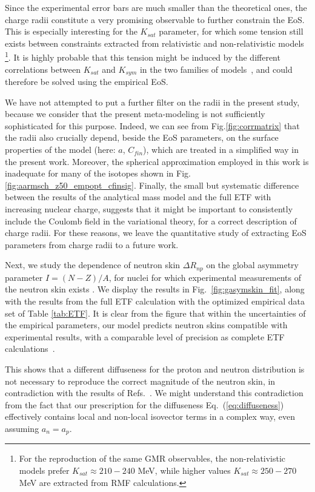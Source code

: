 \documentclass
[aps,prc,twocolumn,showpacs,showkeys,amsmath,floatfix,superscriptaddress]{revtex4}
\begin{document}
{{Since the experimental error bars are much smaller than the theoretical ones, the charge radii constitute a very promising observable to further constrain the EoS. 
This is especially interesting for the $K_{sat}$ parameter, for which some tension still exists\cite{Casali1} between constraints extracted from relativistic  and non-relativistic models
\footnote{For the reproduction of the same GMR observables, the non-relativistic models prefer $K_{sat}\approx 210-240$ MeV, while higher values $K_{sat}\approx 250-270$ MeV are extracted from RMF calculations.}.
It is highly probable that this tension might be induced by the different correlations between $K_{sat}$ and $K_{sym}$ in the two families of models~\cite{Colo04,Colo08}, and could therefore be solved using the empirical EoS.

We have not attempted to put a further filter on the radii in the present study, because we consider that the present meta-modeling is not 
sufficiently sophisticated for this purpose. Indeed, we can see from Fig.\ref{fig:corrmatrix} that the radii also crucially depend, 
beside the EoS parameters, on the surface properties of the model (here: $a$, $C_{fin}$), which are treated in a simplified way in the present work. Moreover, the spherical approximation employed in this work is inadequate for many of the isotopes shown in Fig.\ref{fig:aarmsch_z50_empopt_cfinsig}. Finally, the small but systematic difference between  the results of the analytical mass model and the full ETF with increasing nuclear charge, suggests that it might be important to consistently include the Coulomb field in the variational theory, for a correct description of charge radii. For these reasons, we leave the quantitative study of extracting EoS parameters from charge radii to a future work.

Next, we study the dependence of neutron skin $\Delta R_{np}$ on the global asymmetry parameter 
$I = (N-Z)/A$, for nuclei for which experimental measurements of the neutron skin exists \cite{Trzcinska}. 
We display the results in Fig.~\ref{fig:gasymskin_fit}, along with the results from the full ETF calculation
with the optimized empirical data set of Table \ref{tab:ETF}.  
It is clear from the figure that within the uncertainties of the empirical parameters, our model predicts
neutron skins compatible with experimental results, with a comparable level of precision as complete ETF calculations~\cite{papazoglou}.
 
This shows that a different diffuseness for the proton and neutron distribution is not necessary to reproduce the correct  magnitude of the neutron skin, in contradiction with the results of 
Refs.~\cite{warda09,centelles10,centelles13}. 
We might understand this contradiction from the fact that our prescription for the diffuseness Eq.~(\ref{eq:diffuseness}) effectively contains local and non-local isovector terms in a complex way,
even assuming $a_n=a_p$.  

}}
\end{document}
